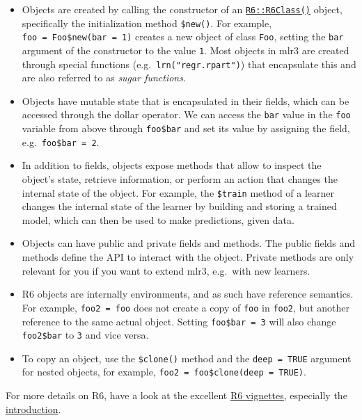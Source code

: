 \documentclass[
]{scrbook}
\providecommand{\tightlist}{%
  \setlength{\itemsep}{0pt}\setlength{\parskip}{0pt}}
\begin{document}
\begin{itemize}
\tightlist
\item
  Objects are created by calling the constructor of an \href{https://www.rdocumentation.org/packages/R6/topics/R6Class}{\texttt{R6::R6Class()}} object, specifically the initialization method \texttt{\$new()}.
  For example, \texttt{foo\ =\ Foo\$new(bar\ =\ 1)} creates a new object of class \texttt{Foo}, setting the \texttt{bar} argument of the constructor to the value \texttt{1}.
  Most objects in mlr3 are created through special functions (e.g.~\texttt{lrn("regr.rpart")}) that encapsulate this and are also referred to as \emph{sugar functions}.
\item
  Objects have mutable state that is encapsulated in their fields, which can be accessed through the dollar operator.
  We can access the \texttt{bar} value in the \texttt{foo} variable from above through \texttt{foo\$bar} and set its value by assigning the field, e.g.~\texttt{foo\$bar\ =\ 2}.
\item
  In addition to fields, objects expose methods that allow to inspect the object's state, retrieve information, or perform an action that changes the internal state of the object.
  For example, the \texttt{\$train} method of a learner changes the internal state of the learner by building and storing a trained model, which can then be used to make predictions, given data.
\item
  Objects can have public and private fields and methods.
  The public fields and methods define the API to interact with the object.
  Private methods are only relevant for you if you want to extend mlr3, e.g.~with new learners.
\item
  R6 objects are internally environments, and as such have reference semantics.
  For example, \texttt{foo2\ =\ foo} does not create a copy of \texttt{foo} in \texttt{foo2}, but another reference to the same actual object.
  Setting \texttt{foo\$bar\ =\ 3} will also change \texttt{foo2\$bar} to \texttt{3} and vice versa.
\item
  To copy an object, use the \texttt{\$clone()} method and the \texttt{deep\ =\ TRUE} argument for nested objects, for example, \texttt{foo2\ =\ foo\$clone(deep\ =\ TRUE)}.
\end{itemize}

For more details on R6, have a look at the excellent \href{https://r6.r-lib.org/}{R6 vignettes}, especially the \href{https://r6.r-lib.org/articles/Introduction.html}{introduction}.
\end{document}
